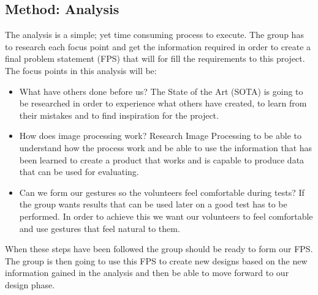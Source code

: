 \subsection{Method: Analysis}
The analysis is a simple; yet time consuming process to execute. The group has to research each focus point and get the information required in order to create a final problem statement (FPS) that will for fill the requirements to this project. The focus points in this analysis will be:

\begin{itemize}
\item What have others done before us? \newline
The State of the Art (SOTA) is going to be researched in order to experience what others have created, to learn from their mistakes and to find inspiration for the project. 

\item How does image processing work? \newline
Research Image Processing to be able to understand how the process work and be able to use the information that has been learned to create a product that works and is capable to produce data that can be used for evaluating.

\item Can we form our gestures so the volunteers feel comfortable during tests? \newline
If the group wants results that can be used later on a good test has to be performed. In order to achieve this we want our volunteers to feel comfortable and use gestures that feel natural to them. 
\end{itemize} 

\pagebreak[1]
When these steps have been followed the group should be ready to form our FPS. The group is then going to use this FPS to create new designs based on the new information gained in the analysis and then be able to move forward to our design phase. 
